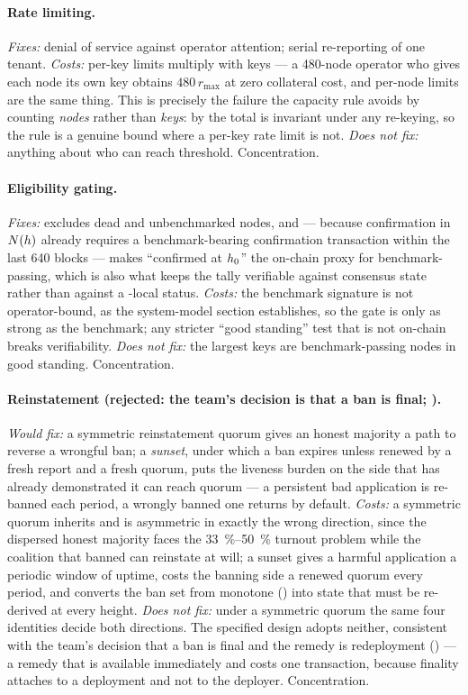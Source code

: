 \paragraph{Rate limiting.} \emph{Fixes:} denial of service against operator attention; serial
re-reporting of one tenant. \emph{Costs:} per-key limits multiply with keys — a 480-node operator
who gives each node its own key obtains $480\,r_{\max}$ at zero collateral cost, and per-node limits
are the same thing. This is precisely the failure the capacity rule avoids by counting
\emph{nodes} rather than \emph{keys}: by  the total is invariant under any
re-keying, so the rule is a genuine bound where a per-key rate limit is not. \emph{Does not fix:}
anything about who can reach threshold. Concentration.

\paragraph{Eligibility gating.} \emph{Fixes:} excludes dead and unbenchmarked nodes, and — because
confirmation in $N(h)$ already requires a benchmark-bearing confirmation transaction within the
last 640 blocks — makes ``confirmed at $h_0$'' the on-chain proxy for benchmark-passing, which is
also what keeps the tally verifiable against consensus state rather than against a
\FluxOS{}-local status. \emph{Costs:} the benchmark signature is not operator-bound, as the
system-model section establishes, so the gate is only as strong as the benchmark; any stricter
``good standing'' test that is not on-chain breaks verifiability. \emph{Does not fix:} the largest
keys are benchmark-passing nodes in good standing. Concentration.

\paragraph{Reinstatement (rejected: the team's decision is that a ban is final;
).} \emph{Would fix:}
a symmetric reinstatement quorum gives an honest majority a path to reverse a wrongful ban; a
\emph{sunset}, under which a ban expires unless renewed by a fresh report and a fresh quorum, puts
the liveness burden on the side that has already demonstrated it can reach quorum — a persistent bad
application is re-banned each period, a wrongly banned one returns by default. \emph{Costs:} a
symmetric quorum inherits  and is asymmetric in
exactly the wrong direction, since the dispersed honest majority faces the \SIrange{33}{50}{\percent}
turnout problem while the coalition that banned can reinstate at will; a sunset gives a harmful
application a periodic window of uptime, costs the banning side a renewed quorum every period, and
converts the ban set from monotone () into state that must be re-derived at
every height. \emph{Does not fix:} under a symmetric quorum the same four identities decide both
directions. The specified design adopts neither, consistent with the team's decision that a ban is
final and the remedy is redeployment () --- a remedy that is available
immediately and costs one transaction, because finality attaches to a deployment and not to the
deployer.
Concentration.

